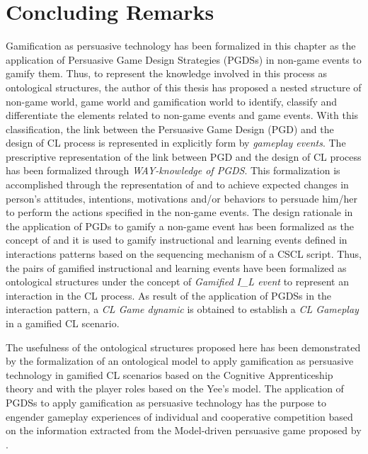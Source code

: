 \section{Concluding Remarks}
\label{sec:ontogacles2-concluding-remarks} 

Gamification as persuasive technology has been formalized in this chapter as the application of Persuasive Game Design Strategies (PGDSs) in non-game events to gamify them.
Thus, to represent the knowledge involved in this process as ontological structures, the author of this thesis has proposed a nested structure of non-game world, game world and gamification world to identify, classify and differentiate the elements related to non-game events and game events.
With this classification, the link between the Persuasive Game Design (PGD) and the design of CL process is represented in explicitly form by \emph{gameplay events}.
The prescriptive representation of the link between PGD and the design of CL process has been formalized through \emph{WAY-knowledge of PGDS}.
This formalization is accomplished through the representation of  and  to achieve expected changes in person's attitudes, intentions, motivations and/or behaviors to persuade him/her to perform the actions specified in the non-game events.
The design rationale in the application of PGDs to gamify a non-game event has been formalized as the concept of  and it is used to gamify instructional and learning events defined in interactions patterns based on the sequencing mechanism of a CSCL script.
Thus, the pairs of gamified instructional and learning events have been formalized as ontological structures under the concept of \emph{Gamified I\_L event} to represent an interaction in the CL process.
As result of the application of PGDSs in the interaction pattern, a \emph{CL Game dynamic} is obtained to establish a \emph{CL Gameplay} in a gamified CL scenario. 

The usefulness of the ontological structures proposed here has been demonstrated by the formalization of an ontological model to apply gamification as persuasive technology in gamified CL scenarios based on the Cognitive Apprenticeship theory and with the player roles based on the Yee's model.
The application of PGDSs to apply gamification as persuasive technology has the purpose to engender gameplay experiences of individual and cooperative competition based on the information extracted from the Model-driven persuasive game proposed by . 

